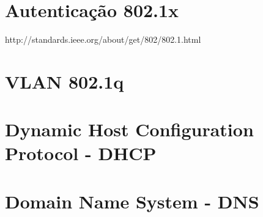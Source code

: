 \documentclass[brazil, ruledheader, pnumromarab,normaltoc]{abnt}
\begin{document}
\section{Autenticação 802.1x}
http://standards.ieee.org/about/get/802/802.1.html


\section{VLAN 802.1q}

\section{Dynamic Host Configuration Protocol - DHCP}


\section{Domain Name System - DNS}



\end{document}

